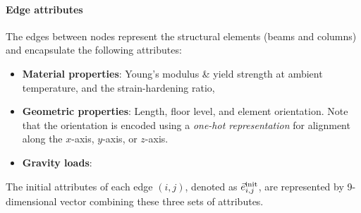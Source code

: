 \paragraph{Edge attributes} The edges between nodes represent the structural elements (beams and columns) and encapsulate the following attributes:
\begin{itemize}
    \item {\bf{Material properties}}: Young's modulus \& yield strength at ambient temperature, and the strain-hardening ratio, 
    \item {\bf{Geometric properties}}: Length, floor level, and element orientation. Note that the orientation is encoded using a {\em{one-hot representation}} for alignment along the $x$-axis, $y$-axis, or $z$-axis. 
    \item {\bf{Gravity loads}}: {}
\end{itemize}
The initial attributes of each edge $(i,j)$, denoted as $\vec{e}_{i,j}^{\text{init}}$, are represented by 9-dimensional vector combining these three sets of attributes.

